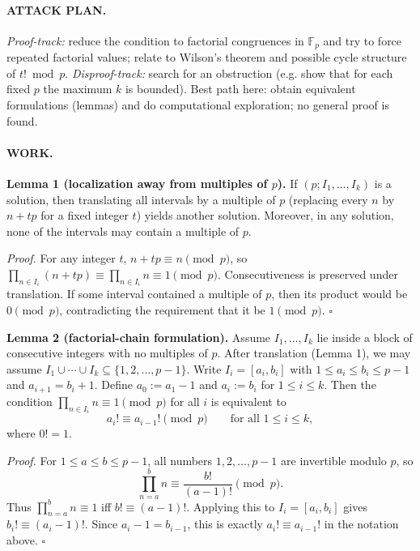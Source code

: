 \paragraph{ATTACK PLAN.}
\emph{Proof-track:} reduce the condition to factorial congruences in $\mathbb{F}_p$ and try to force repeated factorial values; relate to Wilson's theorem and possible cycle structure of $t!\bmod p$.
\emph{Disproof-track:} search for an obstruction (e.g. show that for each fixed $p$ the maximum $k$ is bounded).
Best path here: obtain equivalent formulations (lemmas) and do computational exploration; no general proof is found.

\paragraph{WORK.}
\textbf{Lemma 1 (localization away from multiples of $p$).}
If $(p;I_1,\dots,I_k)$ is a solution, then translating all intervals by a multiple of $p$ (replacing every $n$ by $n+tp$ for a fixed integer $t$) yields another solution.
Moreover, in any solution, none of the intervals may contain a multiple of $p$.

\emph{Proof.}
For any integer $t$, $n+tp\equiv n\pmod p$, so
$\prod_{n\in I_i}(n+tp)\equiv \prod_{n\in I_i}n\equiv 1\pmod p$.
Consecutiveness is preserved under translation.
If some interval contained a multiple of $p$, then its product would be $0\pmod p$, contradicting the requirement that it be $1\pmod p$.
\hfill$\square$

\textbf{Lemma 2 (factorial-chain formulation).}
Assume $I_1,\dots,I_k$ lie inside a block of consecutive integers with no multiples of $p$.
After translation (Lemma 1), we may assume
$I_1\cup\cdots\cup I_k \subseteq \{1,2,\dots,p-1\}$.
Write $I_i=[a_i,b_i]$ with $1\le a_i\le b_i\le p-1$ and $a_{i+1}=b_i+1$.
Define $a_0:=a_1-1$ and $a_i:=b_i$ for $1\le i\le k$.
Then the condition $\prod_{n\in I_i} n \equiv 1\pmod p$ for all $i$ is equivalent to
\[
a_{i}! \equiv a_{i-1}! \pmod p\qquad\text{for all }1\le i\le k,
\]
where $0!=1$.

\emph{Proof.}
For $1\le a\le b\le p-1$, all numbers $1,2,\dots,p-1$ are invertible modulo $p$, so
\[
\prod_{n=a}^{b} n \equiv \frac{b!}{(a-1)!}\pmod p.
\]
Thus $\prod_{n=a}^{b}n\equiv 1$ iff $b!\equiv (a-1)!$.
Applying this to $I_i=[a_i,b_i]$ gives $b_i!\equiv (a_i-1)!$.
Since $a_i-1=b_{i-1}$, this is exactly $a_i!\equiv a_{i-1}!$ in the notation above.
\hfill$\square$


